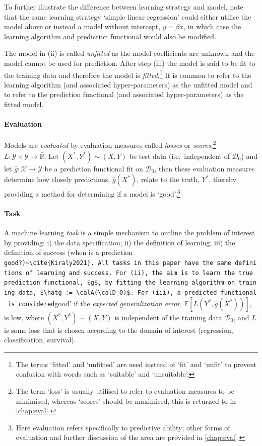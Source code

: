 \documentclass[
  letterpaper,
]{scrbook}
\let\oldparagraph\paragraph
\renewcommand{\paragraph}[1]{\oldparagraph{#1}\mbox{}}
\theoremstyle{plain}
\theoremstyle{definition}
\theoremstyle{remark}
\begin{document}
To further illustrate the difference between learning strategy and
model, note that the same learning strategy `simple linear regression'
could either utilise the model above or instead a model without
intercept, \(y = \beta x\), in which case the learning algorithm and
prediction functional would also be modified.

The model in (ii) is called \emph{unfitted} as the model coefficients
are unknown and the model cannot be used for prediction. After step
(iii) the model is said to be fit to the training data and therefore the
model is
\emph{fitted}.\footnote{The terms `fitted' and `unfitted' are used instead of `fit' and `unfit' to prevent confusion with words such as `suitable' and `unsuitable'.}
It is common to refer to the learning algorithm (and associated
hyper-parameters) as the unfitted model and to refer to the prediction
functional (and associated hyper-parameters) as the fitted model.

\paragraph{Evaluation}

Models are \emph{evaluated} by evaluation measures called \emph{losses}
or
\emph{scores},\footnote{The term `loss' is usually utilised to refer to evaluation measures to be minimised, whereas `scores' should be maximised, this is returned to in \ref{chap:eval}.}
\(L: \mathcal{Y}\times \mathcal{Y}\rightarrow \bar{\mathbb{R}}\). Let
\((X^*, Y^*) \sim (X,Y)\) be test data (i.e.~independent of
\(\mathcal{D}_0\)) and let
\(\hat{g}: \mathcal{X}\rightarrow \mathcal{Y}\) be a prediction
functional fit on \(\mathcal{D}_0\), then these evaluation measures
determine how closely predictions, \(\hat{g}(X^*)\), relate to the
truth, \(Y^*\), thereby providing a method for determining if a model is
`good'.\footnote{Here evaluation refers specifically to predictive ability; other forms of evaluation and further discussion of the area are provided in \ref{chap:eval}.}

\paragraph{Task}

A machine learning \emph{task} is a simple mechanism to outline the
problem of interest by providing: i) the data specification; ii) the
definition of learning; iii) the definition of success (when is a
prediction
\texttt{good\textquotesingle{}?)\textasciitilde{}\textbackslash{}cite\{Kiraly2021\}.\ All\ tasks\ in\ this\ paper\ have\ the\ same\ definitions\ of\ learning\ and\ success.\ For\ (ii),\ the\ aim\ is\ to\ learn\ the\ true\ prediction\ functional,\ \$g\$,\ by\ fitting\ the\ learning\ algorithm\ on\ training\ data,\ \$\textbackslash{}hatg\ :=\ \textbackslash{}calA(\textbackslash{}calD\_0)\$.\ For\ (iii),\ a\ predicted\ functional\ is\ considered}good'
if the \emph{expected generalization error},
\(\mathbb{E}[L(Y^*, \hat{g}(X^*))]\), is low, where
\((X^*, Y^*) \sim (X,Y)\) is independent of the training data
\(\mathcal{D}_0\), and \(L\) is some loss that is chosen according to
the domain of interest (regression, classification, survival).
\end{document}

